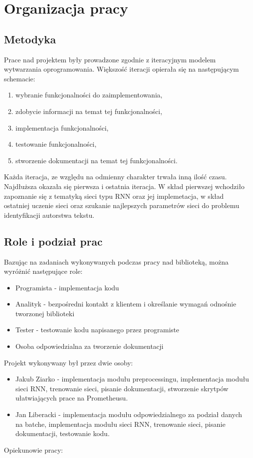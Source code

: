\newpage
\section{Organizacja pracy}

\subsection{Metodyka}

Prace nad projektem były prowadzone zgodnie z iteracyjnym modelem wytwarzania oprogramowania. 
Większość iteracji opierała się na następującym schemacie: 
\begin{enumerate}
  \item wybranie funkcjonalności do zaimplementowania,
  \item zdobycie informacji na temat tej funkcjonalności,
  \item implementacja funkcjonalności,
  \item testowanie funkcjonalności,
  \item stworzenie dokumentacji na temat tej funkcjonalności.
\end{enumerate}
Każda iteracja, ze względu na odmienny charakter trwała inną ilość czasu. Najdłuższa okazała się
pierwsza i ostatnia iteracja. W skład pierwszej wchodziło zapoznanie się z tematyką sieci typu RNN oraz
jej implemetacja, w skład ostatniej uczenie sieci oraz szukanie najlepszych parametrów sieci do problemu 
identyfikacji autorstwa tekstu.

\subsection{Role i podział prac}
Bazując na zadaniach wykonywanych podczas pracy nad biblioteką, można wyróżnić następujące role:
\begin{itemize}
  \item Programista - implementacja kodu
  \item Analityk -  bezpośredni kontakt z klientem i określanie wymagań odnośnie tworzonej biblioteki
  \item Tester - testowanie kodu napisanego przez programiste
  \item Osoba odpowiedzialna za tworzenie dokumentacji
\end{itemize}
Projekt wykonywany był przez dwie osoby:
\begin{itemize}
  \item Jakub Ziarko - implementacja modułu preprocessingu, implementacja modułu sieci RNN, 
  trenowanie sieci, pisanie dokumentacji, stworzenie skrytpów ułatwiających prace na Prometheusu.
  \item Jan Liberacki - implementacja modułu odpowiedzialnego za podział danych na batche, 
  implementacja modułu sieci RNN, trenowanie sieci, pisanie dokumentacji, testowanie kodu.
\end{itemize}
Opiekunowie pracy:

